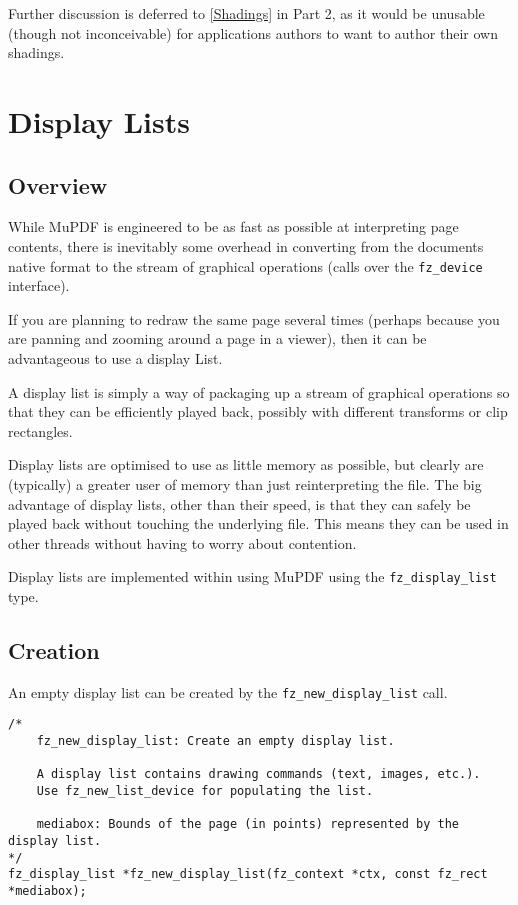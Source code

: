 \documentclass[oneside]{book}
\newcommand{\rjwref}[1] {\autoref{#1} \nameref{#1}}
\begin{document}
Further discussion is deferred to \rjwref{Shadings} in Part 2, as it would be unusable (though not inconceivable) for applications authors to want to author their own shadings.

\chapter{Display Lists}
\label{DisplayLists}

\section{Overview}

While MuPDF is engineered to be as fast as possible at interpreting page contents, there is inevitably some overhead in converting from the documents native format to the stream of graphical operations (calls over the \texttt{fz\_device} interface).

If you are planning to redraw the same page several times (perhaps because you are panning and zooming around a page in a viewer), then it can be advantageous to use a display List.

A display list is simply a way of packaging up a stream of graphical operations so that they can be efficiently played back, possibly with different transforms or clip rectangles.

Display lists are optimised to use as little memory as possible, but clearly are (typically) a greater user of memory than just reinterpreting the file. The big advantage of display lists, other than their speed, is that they can safely be played back without touching the underlying file. This means they can be used in other threads without having to worry about contention.

Display lists are implemented within using MuPDF using the \texttt{fz\_display\_list} type.

\section{Creation}

An empty display list can be created by the \texttt{fz\_new\_display\_list} call.

\begin{lstlisting}
/*
	fz_new_display_list: Create an empty display list.

	A display list contains drawing commands (text, images, etc.).
	Use fz_new_list_device for populating the list.

	mediabox: Bounds of the page (in points) represented by the display list.
*/
fz_display_list *fz_new_display_list(fz_context *ctx, const fz_rect *mediabox);
\end{lstlisting}
\end{document}
